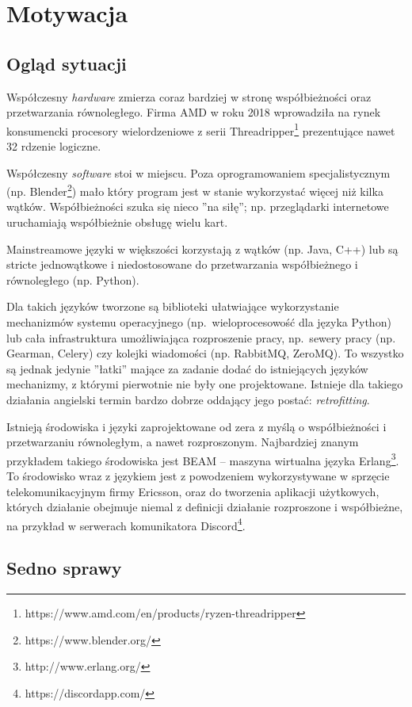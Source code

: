 \documentclass[11pt,oneside,a4paper,titlepage,onecolumn]{book}
\begin{document}
\section{Motywacja}

\subsection{Ogląd sytuacji}

Współczesny \emph{hardware} zmierza coraz bardziej w stronę współbieżności oraz przetwarzania równoległego.
Firma AMD w roku 2018 wprowadziła na rynek konsumencki procesory wielordzeniowe z serii
Threadripper\footnote{https://www.amd.com/en/products/ryzen-threadripper} prezentujące nawet 32 rdzenie logiczne.

Współczesny \emph{software} stoi w miejscu. Poza oprogramowaniem specjalistycznym (np.
Blender\footnote{https://www.blender.org/}) mało który program jest w stanie wykorzystać więcej niż kilka wątków.
Współbieżności szuka się nieco ''na siłę''; np. przeglądarki internetowe uruchamiają współbieżnie obsługę
wielu kart.

Mainstreamowe języki w większości korzystają z wątków (np. Java, C++) lub są stricte jednowątkowe i
niedostosowane do przetwarzania współbieżnego i równoległego (np. Python).

Dla takich języków tworzone są biblioteki ułatwiające wykorzystanie mechanizmów systemu operacyjnego
(np.~wieloprocesowość dla języka Python) lub cała infrastruktura umożliwiająca rozproszenie pracy,
np.~sewery pracy (np. Gearman, Celery) czy kolejki wiadomości (np. RabbitMQ, ZeroMQ).
To wszystko są jednak jedynie ''łatki'' mające za zadanie dodać do istniejących języków mechanizmy, z którymi
pierwotnie nie były one projektowane. Istnieje dla takiego działania angielski termin bardzo dobrze oddający
jego postać: \emph{retrofitting}.

Istnieją środowiska i języki zaprojektowane od zera z myślą o współbieżności i przetwarzaniu równoległym, a
nawet rozproszonym.
Najbardziej znanym przykładem takiego środowiska jest BEAM -- maszyna wirtualna
języka Erlang\footnote{http://www.erlang.org/}. To środowisko wraz z językiem jest z powodzeniem wykorzystywane w
sprzęcie telekomunikacyjnym firmy Ericsson, oraz do tworzenia aplikacji użytkowych, których działanie obejmuje
niemal z definicji działanie rozproszone i współbieżne, na przykład w serwerach komunikatora
Discord\footnote{https://discordapp.com/}.

\subsection{Sedno sprawy}
\end{document}
